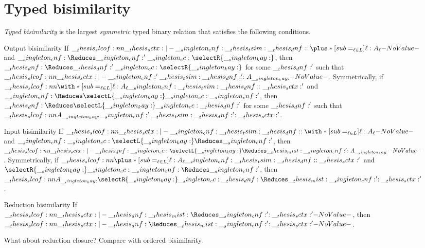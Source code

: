 \chapter{Typed bisimilarity}\label{ch:typed-bisim}

\begin{definition}
  \emph{Typed bisimilarity} is the largest \emph{symmetric} typed binary relation that satisfies the following conditions.
  \begin{thmdescription}
  \item[Output bisimilarity]
    If $\slcof{\sctx |- \cnf \tsim \dnf : \plus*[sub=_{\ell \in L}]{\ell:A_{\ell}}}$ and $\cnf \Reduces \cnf' \cc \selectR{\kay}$, then $\dnf \Reduces \dnf' \cc \selectR{\kay}$ for some $\__thesis_dnf:'$ such that $\slcof{\sctx |- \cnf' \tsim \dnf' : A_{\kay}}$.
    Symmetrically, if $\slcof{\with*[sub=_{\ell \in L}]{\ell:A_{\ell}} |- \cnf \tsim \dnf : \sctx'}$ and $\cnf \Reduces \selectL{\kay} \cc \cnf'$, then $\dnf \Reduces \selectL{\kay} \cc \dnf'$ for some $\__thesis_dnf:'$ such that $\slcof{A_{\kay} |- \cnf' \tsim \dnf' : \sctx'}$.

  \item[Input bisimilarity]
    If $\slcof{\sctx |- \cnf \tsim \dnf : \with*[sub=_{\ell \in L}]{\ell:A_{\ell}}}$ and $\cnf \cc \selectL{\kay} \Reduces \cnf'$, then $\slcof{\sctx |- \dnf \cc \selectL{\kay} \Reduces\mist \cnf' : A_{\kay}}$.
    Symmetrically, if $\slcof{\plus*[sub=_{\ell \in L}]{\ell:A_{\ell}} |- \cnf \tsim \dnf : \sctx'}$ and $\selectR{\kay} \cc \cnf \Reduces \cnf'$, then $\slcof{A_{\kay} |- \selectR{\kay} \cc \dnf \Reduces\mist \cnf' : \sctx'}$.

  \item[Reduction bisimilarity]
    If $\slcof{\sctx |- \dnf \mist\Reduces \cnf' : \sctx'}$, then $\slcof{\sctx |- \dnf \Reduces\mist \cnf' : \sctx'}$.
  \end{thmdescription}
\end{definition}

What about reduction closure?
Compare with ordered bisimilarity.

